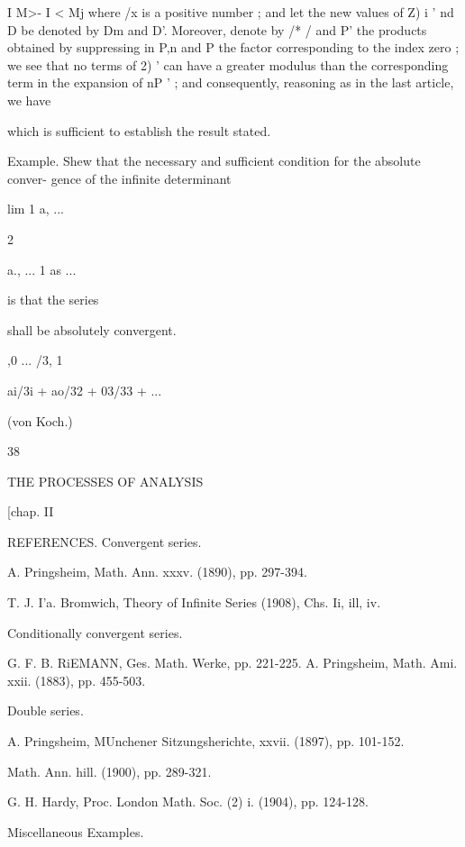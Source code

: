 I M>- I < Mj where /x is a positive number ; and let the new values of
Z) i ' nd D be denoted by Dm and D'. Moreover, denote by /* / and P'
the products obtained by suppressing in P,n and P the factor
corresponding to the index zero ; we see that no terms of 2) ' can
have a greater modulus than the corresponding term in the expansion of
nP ' ; and consequently, reasoning as in the last article, we have

which is sufficient to establish the result stated.

Example. Shew that the necessary and sufficient condition for the
absolute conver- gence of the infinite determinant

lim 1 a, ...



 2



a., ... 1 as ...



is that the series

shall be absolutely convergent.



,0 ... /3, 1

ai/3i + ao/32 + 03/33 + ...



(von Koch.)



38



THE PROCESSES OF ANALYSIS



[chap. II



REFERENCES. Convergent series.

A. Pringsheim, Math. Ann. xxxv. (1890), pp. 297-394.

T. J. I'a. Bromwich, Theory of Infinite Series (1908), Chs. Ii, ill,
iv.

Conditionally convergent series.

G. F. B. RiEMANN, Ges. Math. Werke, pp. 221-225. A. Pringsheim, Math.
Ami. xxii. (1883), pp. 455-503.

Double series.

A. Pringsheim, MUnchener Sitzungsherichte, xxvii. (1897), pp. 101-152.

    Math. Ann. hill. (1900), pp. 289-321.

G. H. Hardy, Proc. London Math. Soc. (2) i. (1904), pp. 124-128.



Miscellaneous Examples.

